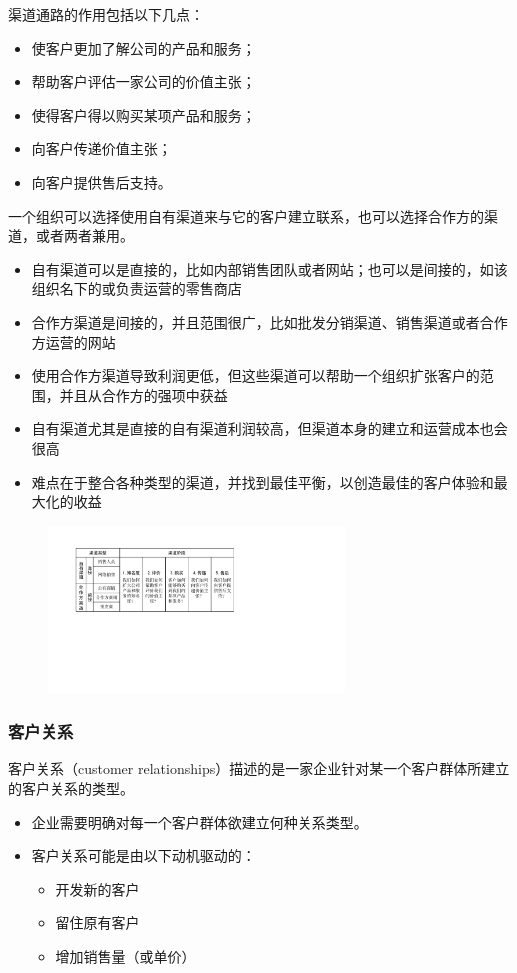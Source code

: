	渠道通路的作用包括以下几点：
	\begin{itemize}
		\item 使客户更加了解公司的产品和服务；
		\item 帮助客户评估一家公司的价值主张；
		\item 使得客户得以购买某项产品和服务；
		\item 向客户传递价值主张；
		\item 向客户提供售后支持。
	\end{itemize}


	一个组织可以选择使用自有渠道来与它的客户建立联系，也可以选择合作方的渠道，或者两者兼用。
	\begin{itemize}
		\item 自有渠道可以是直接的，比如内部销售团队或者网站；也可以是间接的，如该组织名下的或负责运营的零售商店
		\item 合作方渠道是间接的，并且范围很广，比如批发分销渠道、销售渠道或者合作方运营的网站
		\item 使用合作方渠道导致利润更低，但这些渠道可以帮助一个组织扩张客户的范围，并且从合作方的强项中获益
		\item 自有渠道尤其是直接的自有渠道利润较高，但渠道本身的建立和运营成本也会很高
		\item 难点在于整合各种类型的渠道，并找到最佳平衡，以创造最佳的客户体验和最大化的收益
	\end{itemize}
	
	\begin{figure}[H]
		\vspace{-0.5em}
		\centering
		\includegraphics[width=0.7\textwidth]{img/渠道通路的类型和阶段.pdf}
		\vspace{-0.5em}
	\end{figure}

	\subsubsection{客户关系}
	客户关系（customer relationships）描述的是一家企业针对某一个客户群体所建立的客户关系的类型。
	\begin{itemize}
		\item 企业需要明确对每一个客户群体欲建立何种关系类型。
		\item 客户关系可能是由以下动机驱动的：
		\begin{itemize}
			\item 开发新的客户
			\item 留住原有客户
			\item 增加销售量（或单价）
		\end{itemize}
	\end{itemize}

